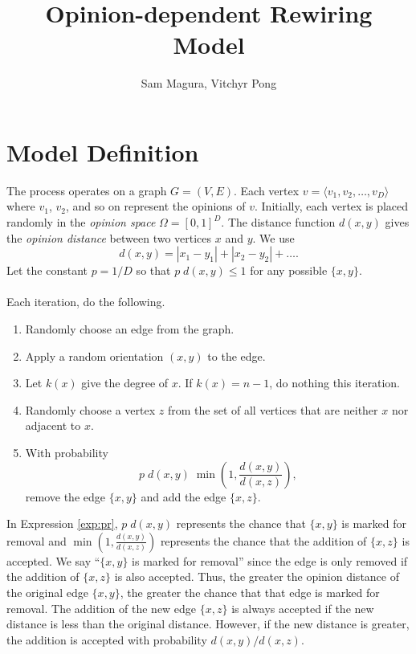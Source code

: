 \documentclass[a4paper,10pt]{article}
\title{Opinion-dependent Rewiring Model}
\author{Sam Magura, Vitchyr Pong}
\begin{document}
\maketitle
\section{Model Definition}
The process operates on a graph $G = (V, E)$. Each vertex $v = \langle v_1, v_2, \ldots, v_D \rangle$ where $v_1$, $v_2$, and so on represent the opinions of $v$. Initially, each vertex is placed randomly in the \emph{opinion space} $\Omega = [0, 1]^D$. The distance function $d(x, y)$ gives the \emph{opinion distance} between two vertices $x$ and $y$. We use
\begin{equation}
 d(x, y) = |x_1 - y_1| + |x_2 - y_2| + \ldots.
\end{equation}
Let the constant $p = 1 / D$ so that $p \; d(x, y) \leq 1$ for any possible $\{x, y\}$.  
\\\\Each iteration, do the following.
\begin{enumerate}
 \item Randomly choose an edge from the graph.
 \item Apply a random orientation $(x, y)$ to the edge.
 \item Let $k(x)$ give the degree of $x$. If $k(x) = n - 1$, do nothing this iteration.
 \item \label{item:z} Randomly choose a vertex $z$ from the set of all vertices that are neither $x$ nor adjacent to $x$.
 \item With probability
 \begin{equation}
 \label{exp:pr}
  p \; d(x, y) \; \min\left(1, \frac{d(x, y)}{d(x, z)}\right), 
 \end{equation}
remove the edge $\{x, y\}$ and add the edge $\{x, z\}$. 
\end{enumerate}
In Expression \ref{exp:pr}, $p \; d(x, y)$ represents the chance that $\{x, y\}$ is marked for removal and $\min(1, \frac{d(x, y)}{d(x, z)})$ represents the chance that the addition of $\{x, z\}$ is accepted. We say ``$\{x, y\}$ is marked for removal'' since the edge is only removed if the addition of $\{x, z\}$ is also accepted. Thus, the greater the opinion distance of the original edge $\{x, y\}$, the greater the chance that that edge is marked for removal. The addition of the new edge $\{x, z\}$ is always accepted if the new distance is less than the original distance. However, if the new distance is greater, the addition is accepted with probability $d(x, y) / d(x, z).$
\end{document}

